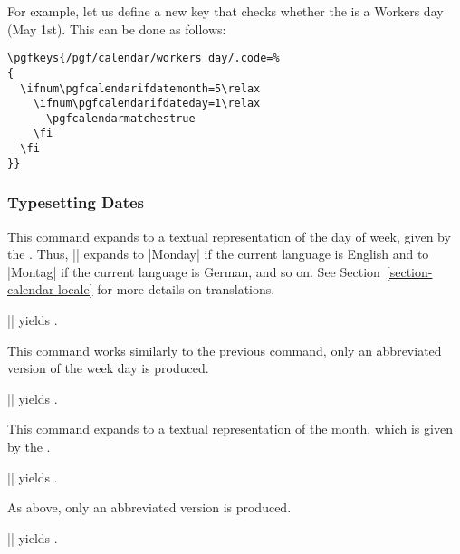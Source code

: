 \begin{command}{\pgfcalendarifdate{}}
    For example, let us define a new key that checks whether the  is
    a Workers day (May 1st). This can be done as follows:
\begin{verbatim}
\pgfkeys{/pgf/calendar/workers day/.code=%
{
  \ifnum\pgfcalendarifdatemonth=5\relax
    \ifnum\pgfcalendarifdateday=1\relax
      \pgfcalendarmatchestrue
    \fi
  \fi
}}
\end{verbatim}
\end{command}


\subsubsection{Typesetting Dates}

\begin{command}{\pgfcalendarweekdayname{}}
    This command expands to a textual representation of the day of week, given
    by the . Thus, || expands
    to |Monday| if the current language is English and to |Montag| if the
    current language is German, and so on. See
    Section~\ref{section-calendar-locale} for more details on translations.

    \example || yields
    \texttt{}.
\end{command}

\begin{command}{\pgfcalendarweekdayshortname{}}
    This command works similarly to the previous command, only an abbreviated
    version of the week day is produced.

    \example || yields
    \texttt{}.
\end{command}

\begin{command}{\pgfcalendarmonthname{}}
    This command expands to a textual representation of the month, which is
    given by the .

    \example || yields
    \texttt{}.
\end{command}

\begin{command}{\pgfcalendarmonthshortname{}}
    As above, only an abbreviated version is produced.

    \example || yields
    \texttt{}.
\end{command}


